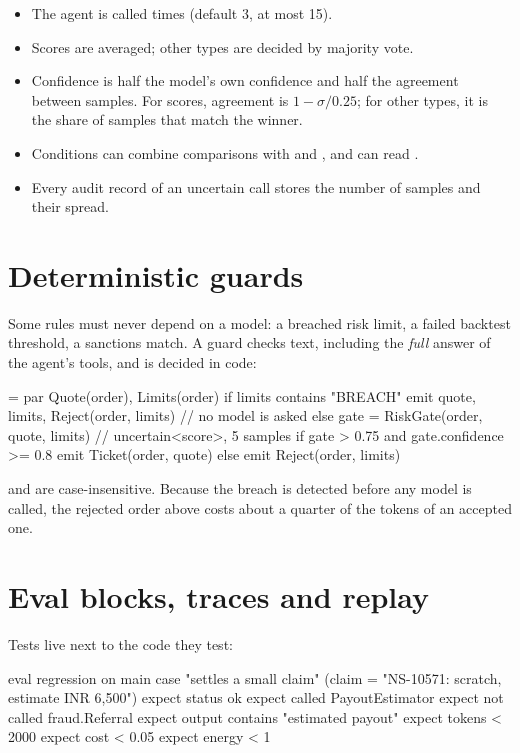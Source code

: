 \begin{itemize}
\item The agent is called  times (default 3, at most 15).
\item Scores are averaged; other types are decided by majority vote.
\item Confidence is half the model's own confidence and half the agreement between samples. For scores, agreement is $1-\sigma/0.25$; for other types, it is the share of samples that match the winner.
\item Conditions can combine comparisons with  and , and can read .
\item Every audit record of an uncertain call stores the number of samples and their spread.
\end{itemize}

\section{Deterministic guards}

Some rules must never depend on a model: a breached risk limit, a failed backtest threshold, a sanctions match. A guard checks text, including the \emph{full} answer of the agent's tools, and is decided in code:

\begin{algo} = par { Quote(order), Limits(order) }
if limits contains "BREACH" {
    emit quote, limits, Reject(order, limits)        // no model is asked
} else {
    gate = RiskGate(order, quote, limits)            // uncertain<score>, 5 samples
    if gate > 0.75 and gate.confidence >= 0.8 { emit Ticket(order, quote) }
    else { emit Reject(order, limits) }
}
\end{algo}

 and  are case-insensitive. Because the breach is detected before any model is called, the rejected order above costs about a quarter of the tokens of an accepted one.

\section{Eval blocks, traces and replay}

Tests live next to the code they test:

\begin{algo}[title=An eval block]
eval regression on main {
    case "settles a small claim" (claim = "NS-10571: scratch, estimate INR 6,500") {
        expect status ok
        expect called PayoutEstimator
        expect not called fraud.Referral
        expect output contains "estimated payout"
        expect tokens < 2000
        expect cost < 0.05
        expect energy < 1
    }
}
\end{algo}


